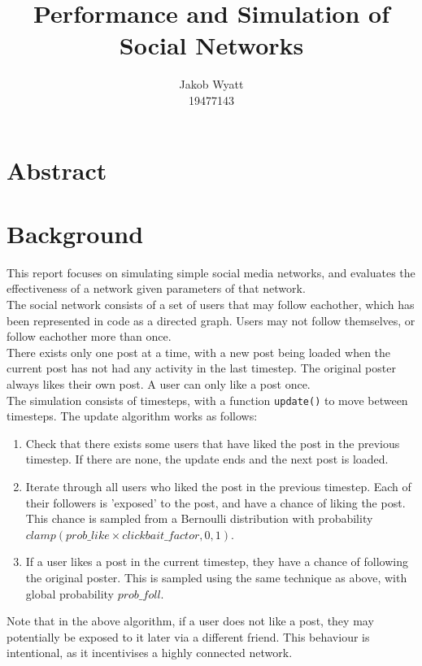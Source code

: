 \documentclass{article}
\title{Performance and Simulation of Social Networks}
\author{Jakob Wyatt\\19477143}
\begin{document}
\maketitle
\section{Abstract}
\pagebreak
\section{Background}
This report focuses on simulating simple social media networks,
and evaluates the effectiveness of a network given parameters
of that network.\\
The social network consists of a set of users that may follow eachother,
which has been represented in code as a directed graph. Users may not follow themselves,
or follow eachother more than once.\\
There exists only one post at a time, with a new post being loaded when the current
post has not had any activity in the last timestep. The original poster always
likes their own post. A user can only like a post once.\\
The simulation consists
of timesteps, with a function \texttt{update()} to move between timesteps.
The update algorithm works as follows:
\begin{enumerate}
    \item Check that there exists some users that have liked the post in the previous timestep.
            If there are none, the update ends and the next post is loaded.
    \item Iterate through all users who liked the post in the previous timestep.
            Each of their followers is 'exposed' to the post, and have a chance of liking the post.
            This chance is sampled from a Bernoulli distribution with probability
            $\mathit{clamp}\left(\mathit{prob\_like} \times \mathit{clickbait\_factor}, 0, 1\right)$.
    \item If a user likes a post in the current timestep, they have a chance of following the
            original poster. This is sampled using the same technique as above, with global probability
            $\mathit{prob\_foll}$.
\end{enumerate}
Note that in the above algorithm, if a user does not like a post, they may potentially
be exposed to it later via a different friend. This behaviour is intentional, as it incentivises
a highly connected network.
\end{document}
